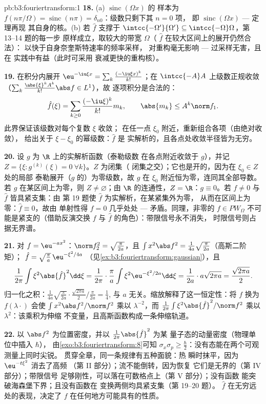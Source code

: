 \begin{solution}{pb:b3:fouriertransform:1}
\textbf{18.} (a) $\operatorname{sinc}(\Omega x)$ 的
样本为 $f(n\pi/\Omega) = \operatorname{sinc}(n\pi) =
\delta_{n0}$：级数只剩下其 $n = 0$ 项，
即 $\operatorname{sinc}(\Omega x)$ --- 定理再现
其自身的核。(b) 若 $\hat f$ 支撑于
$\intcc{-\Omega'}{\Omega'} \subseteq
\intcc{-\Omega}\Omega$，第 13--14 题的每一步
原样成立，取较大的带宽 $\Omega$（
$\hat f$ 在较大区间上的展开仍然合法）：
以快于自身奈奎斯特速率的频率采样，
对重构毫无影响 --- 过采样无害，且在
实践中有益（此时可采用
衰减更快的重构核）。

\textbf{19.} 在积分内展开 $\eu^{-\iu\xi x} =
\sum_k\frac{(-\iu\xi x)^k}{k!}$；在
$\intcc{-A}A$ 上级数正规收敛
（$\sum_k\frac{\abs{\xi}^kA^k}{k!}\abs f \in L^1$），故
逐项积分是合法的：
\[
\hat f(\xi) = \sum_{k\geq0}\frac{(-\iu\xi)^k}{k!}m_k,
\qquad \abs{m_k} \leq A^k\norm f_1 .
\]
此界保证该级数对每个复数 $\xi$ 收敛；
在任一点 $\xi_0$ 附近，重新组合各项（由绝对收敛），
给出关于 $\xi - \xi_0$ 的幂级数：$\hat f$ 是
实解析的，且各点处收敛半径皆为无穷。

\textbf{20.} 设 $g$ 为 $\R$ 上的实解析函数（泰勒级数
在各点附近收敛于 $g$），并记 $Z = \{\xi :
g^{(k)}(\xi) = 0\ \forall k\}$。$Z$ 为闭集（
闭集之交）；它也是开的，因为在 $\xi_0 \in Z$ 处的局部
泰勒展开（$g$ 的）为零级数，故 $g$
在 $\xi_0$ 附近恒为零，连同其全部导数。若
$g$ 在某区间上为零，则 $Z \neq \varnothing$；由
$\R$ 的连通性，$Z = \R$：$g \equiv 0$。若 $f
\neq 0$ 与 $\hat f$ 皆具紧支集：由
第 19 题使 $\hat f$ 为实解析，在某紧集外为零，
从而在区间上为零：$\hat f \equiv 0$，故由
单射性得 $f = 0$ 几乎处处 --- 矛盾。同理，非零的 $f \in
PW_\Omega$ 不可能是紧支的（借助反演交换
$f$ 与 $\hat f$ 的角色）：带限信号永不消失，
时限信号则占据无界谱。

\textbf{21.} 对 $f = \eu^{-ax^2}$：$\norm f_2^2 =
\sqrt{\frac\pi{2a}}$，且 $\int x^2\abs f^2 =
\frac1{4a}\sqrt{\frac{\pi}{2a}}$（高斯二阶矩）；
$\hat f = \sqrt{\frac\pi a}\,\eu^{-\xi^2/4a}$
（见\cref{ex:b3:fouriertransform:gaussian}），且
\[
\frac1{2\pi}\int\xi^2\abs{\hat f}^2\dd\xi =
\frac1{2\pi}\cdot\frac\pi a\int\xi^2
\eu^{-\xi^2/2a}\dd\xi = \frac1{2a}\cdot a\sqrt{2\pi a}
= \frac{\sqrt{2\pi a}}2 .
\]
归一化之积：$\frac1{4a}\sqrt{\frac\pi{2a}}\cdot
\frac{\sqrt{2\pi a}}2\big/\frac{\pi}{2a} = \frac14$,
与 $a$ 无关。缩放解释了这一恒定性：将
$f$ 换为 $f(\lambda\cdot)$ 会使 $\int x^2\abs f^2/\norm
f^2$ 乘以 $\lambda^{-2}$，而 $\frac1{2\pi}\int\xi^2\abs{\hat
f}^2/\norm f^2$ 乘以 $\lambda^{2}$：该乘积为伸缩
不变量，且高斯函数构成一条伸缩轨道。

\textbf{22.} 以 $\abs f^2$ 为位置密度，并以
$\frac1{2\pi}\abs{\hat f}^2$ 为某
量子态的动量密度（物理单位中插入 $\hbar$），
由\cref{exo:b3:fouriertransform:8}可知 $\sigma_x\sigma_p
\geq \frac\hbar2$：没有态能在两个可观测量上同时尖锐。
贯穿全章，同一条规律有五种面貌：热
瞬时抹平，因为 $\eu^{-t\xi^2}$ 消去了高频
（第 II 部分）；流不能倒转，因为恢复
它们是无界的（第 IV 部分）；带限信号
足够刚性，可以落在可数格点上（第 V 部分）；没有函数
能突破海森堡下界；且没有函数在
变换两侧均具紧支集（第 19--20 题）。
$\hat f$ 在无穷远处的表现，决定了 $f$
在任何地方可能具有的性质。


\end{solution}
